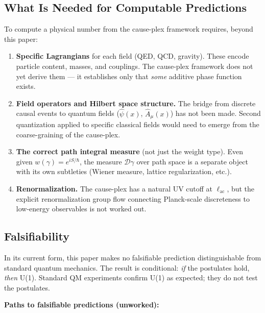\documentclass[11pt]{article}
\theoremstyle{definition}
\theoremstyle{remark}
\begin{document}
\subsection{What Is Needed for Computable
Predictions}\label{what-is-needed-for-computable-predictions}

To compute a physical number from the cause-plex framework requires,
beyond this paper:

\begin{enumerate}
\def\labelenumi{\arabic{enumi}.}
\item
  \textbf{Specific Lagrangians} for each field (QED, QCD, gravity).
  These encode particle content, masses, and couplings. The cause-plex
  framework does not yet derive them --- it establishes only that
  \emph{some} additive phase function exists.
\item
  \textbf{Field operators and Hilbert space structure.} The bridge from
  discrete causal events to quantum fields (\(\hat{\psi}(x)\),
  \(\hat{A}_\mu(x)\)) has not been made. Second quantization applied to
  specific classical fields would need to emerge from the
  coarse-graining of the cause-plex.
\item
  \textbf{The correct path integral measure} (not just the weight type).
  Even given \(w(\gamma) = e^{iS/\hbar}\), the measure
  \(\mathcal{D}\gamma\) over path space is a separate object with its
  own subtleties (Wiener measure, lattice regularization, etc.).
\item
  \textbf{Renormalization.} The cause-plex has a natural UV cutoff at
  \(\ell_{\mathrm{ac}}\), but the explicit renormalization group flow
  connecting Planck-scale discreteness to low-energy observables is not
  worked out.
\end{enumerate}

\subsection{Falsifiability}\label{falsifiability}

In its current form, this paper makes no falsifiable prediction
distinguishable from standard quantum mechanics. The result is
conditional: \emph{if} the postulates hold, \emph{then} U(1). Standard
QM experiments confirm U(1) as expected; they do not test the
postulates.

\textbf{Paths to falsifiable predictions (unworked):}
\end{document}
